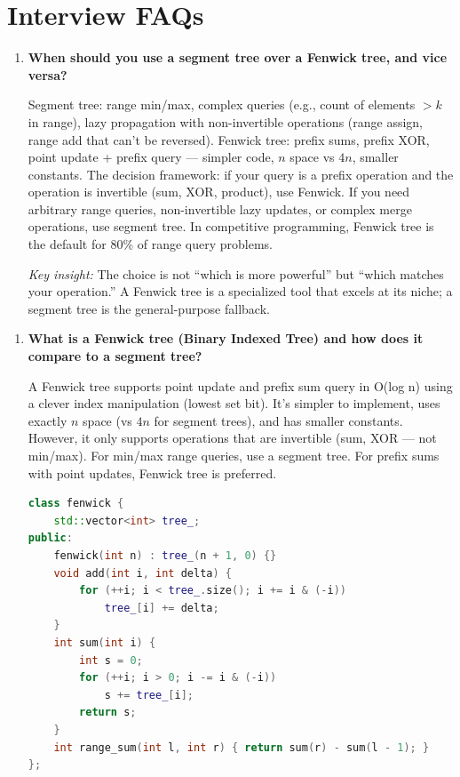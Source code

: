 \section{Interview FAQs}

\begin{enumerate}
\item \textbf{When should you use a segment tree over a Fenwick tree, and vice versa?}

Segment tree: range min/max, complex queries (e.g., count of elements $> k$ in range), lazy propagation with non-invertible operations (range assign, range add that can't be reversed). Fenwick tree: prefix sums, prefix XOR, point update + prefix query --- simpler code, $n$ space vs $4n$, smaller constants. The decision framework: if your query is a prefix operation and the operation is invertible (sum, XOR, product), use Fenwick. If you need arbitrary range queries, non-invertible lazy updates, or complex merge operations, use segment tree. In competitive programming, Fenwick tree is the default for 80\% of range query problems.

\textit{Key insight:} The choice is not ``which is more powerful'' but ``which matches your operation.'' A Fenwick tree is a specialized tool that excels at its niche; a segment tree is the general-purpose fallback.
\end{enumerate}

\begin{enumerate}
\item \textbf{What is a Fenwick tree (Binary Indexed Tree) and how does it compare to a segment tree?}

A Fenwick tree supports point update and prefix sum query in O(log n) using a clever index manipulation (lowest set bit). It's simpler to implement, uses exactly $n$ space (vs $4n$ for segment trees), and has smaller constants. However, it only supports operations that are invertible (sum, XOR — not min/max). For min/max range queries, use a segment tree. For prefix sums with point updates, Fenwick tree is preferred.

\begin{lstlisting}[language=C++]
class fenwick {
    std::vector<int> tree_;
public:
    fenwick(int n) : tree_(n + 1, 0) {}
    void add(int i, int delta) {
        for (++i; i < tree_.size(); i += i & (-i))
            tree_[i] += delta;
    }
    int sum(int i) {
        int s = 0;
        for (++i; i > 0; i -= i & (-i))
            s += tree_[i];
        return s;
    }
    int range_sum(int l, int r) { return sum(r) - sum(l - 1); }
};
\end{lstlisting}
\end{enumerate}


